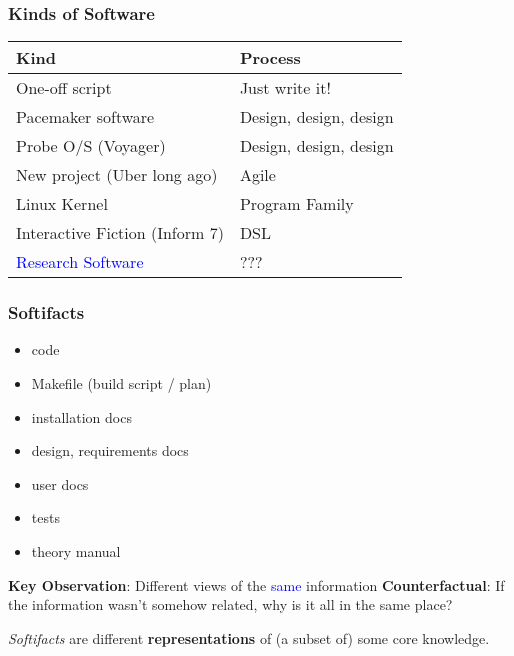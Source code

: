\documentclass{beamer}
\begin{document}

\begin{frame}

\frametitle{Kinds of Software}

\begin{tabular}{|l|l|}
\hline 
\textbf{Kind} & \textbf{Process} \\ \hline\noalign{\pause}
One-off script & Just write it! \\ \hline\noalign{\pause}
Pacemaker software & Design, design, design \\ \hline\noalign{\pause}
Probe O/S (Voyager) & Design, design, design \\ \hline\noalign{\pause}
New project (Uber long ago) & Agile \\ \hline\noalign{\pause}
Linux Kernel & Program Family \\ \hline\noalign{\pause}
Interactive Fiction (Inform 7) & DSL \\ \hline\noalign{\pause}
\textcolor{blue}{Research Software} & ??? \\ \hline
\end{tabular}

\end{frame}



\begin{frame}

\frametitle{Softifacts}

\begin{itemize}
\item code
\item Makefile (build script / plan)
\item installation docs
\item design, requirements docs
\item user docs
\item tests
\item theory manual
\end{itemize}
\pause
\vspace*{4mm}
\textbf{Key Observation}: Different views of the \textcolor{blue}{same}
information
\pause
\textbf{Counterfactual}: If the information wasn't somehow related, why is
it all in the same place?
\pause
\begin{definition} \emph{Softifacts} are different \textbf{representations} of 
(a subset of) some core knowledge.
\end{definition}

\end{frame}
\end{document}
